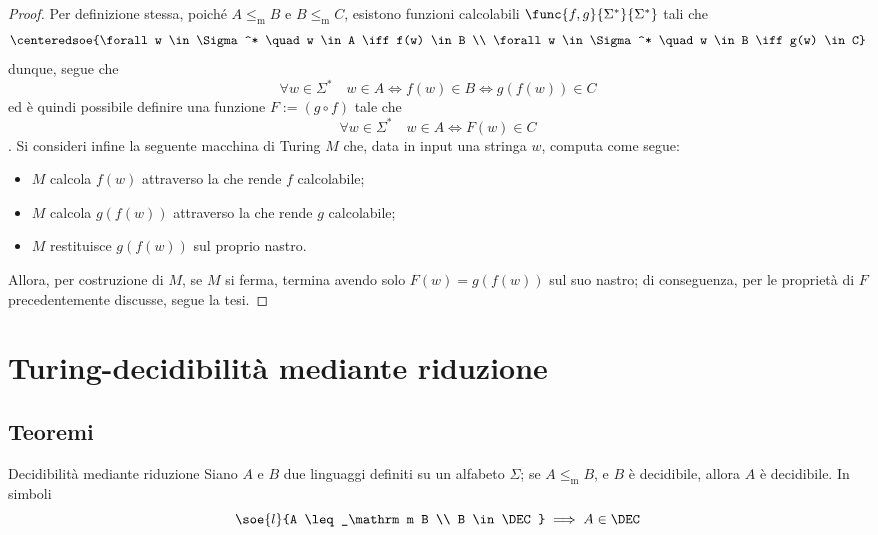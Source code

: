 \documentclass[a4paper, 12pt]{report}
\begin{document}
    \begin{proof}
        Per definizione stessa, poiché $A \leq_\mathrm m B$ e $B \leq_\mathrm m C$, esistono funzioni calcolabili $\func{f, g}{\Sigma^*}{\Sigma^*}$ tali che $$\centeredsoe{\forall w \in \Sigma ^* \quad w \in A \iff f(w) \in B \\ \forall w \in \Sigma^* \quad w \in B \iff g(w) \in C}$$ dunque, segue che $$\forall w \in \Sigma^* \quad w \in A \iff f(w) \in B \iff g(f(w)) \in C$$ ed è quindi possibile definire una funzione $F := (g \circ f)$ tale che $$\forall w \in \Sigma^* \quad w \in A \iff F(w) \in C$$. Si consideri infine la seguente macchina di Turing $M$ che, data in input una stringa $w$, computa come segue:

        \begin{itemize}
            \item $M$ calcola $f(w)$ attraverso la \TM che rende $f$ calcolabile;
            \item $M$ calcola $g(f(w))$ attraverso la \TM che rende $g$ calcolabile;
            \item $M$ restituisce $g(f(w))$ sul proprio nastro.
        \end{itemize}

        Allora, per costruzione di $M$, se $M$ si ferma, termina avendo solo $F(w) = g(f(w))$ sul suo nastro; di conseguenza, per le proprietà di $F$ precedentemente discusse, segue la tesi.
    \end{proof}

    \section{Turing-decidibilità mediante riduzione}

    \subsection{Teoremi}

    \begin{framedthm}[label={dec w red}]{Decidibilità mediante riduzione}
        Siano $A$ e $B$ due linguaggi definiti su un alfabeto $\Sigma$; se $A \leq_\mathrm m B$, e $B$ è decidibile, allora $A$ è decidibile. In simboli $$\soe{l}{A \leq_\mathrm m B \\ B \in \DEC} \implies A \in \DEC$$
    \end{framedthm}
\end{document}
